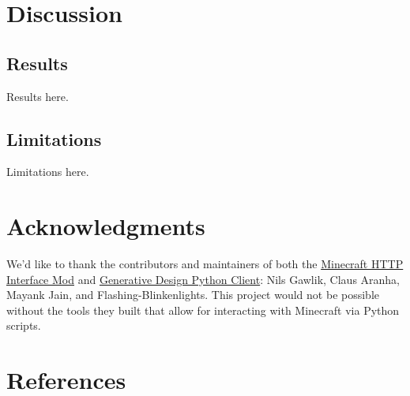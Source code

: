 \documentclass[11pt, oneside]{article}
\begin{document}
\begin{normalsize}
\newpage

\section{Discussion}
\label{Discussion}

\subsection{Results}

Results here. 

\subsection{Limitations}

Limitations here. 

\newpage

\section{Acknowledgments}
\label{Acknowledgments}

We'd like to thank the contributors and maintainers of both the \href{https://github.com/nilsgawlik/gdmc_http_interface}{Minecraft HTTP Interface Mod} and \href{https://github.com/nilsgawlik/gdmc_http_client_python}{Generative Design Python Client}: Nils Gawlik, Claus Aranha, Mayank Jain, and Flashing-Blinkenlights. This project would not be possible without the tools they built that allow for interacting with Minecraft via Python scripts.

\section{References}
\label{references}
\nocite{*}
\printbibliography[heading=none]

\end{normalsize}
\end{document}
